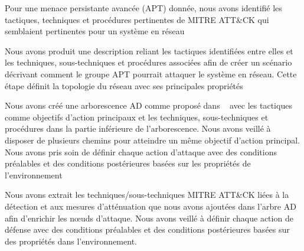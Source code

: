 \begin{enumerate*}[label=\arabic*),itemjoin={;\quad}]

    \item Pour une menace persistante avancée (APT) donnée, nous avons identifié les tactiques, techniques et procédures pertinentes de MITRE ATT\&CK qui semblaient pertinentes pour un système en réseau

    \item Nous avons produit une description reliant les tactiques identifiées entre elles et les techniques, sous-techniques et procédures associées afin de créer un scénario décrivant comment le groupe APT pourrait attaquer le système en réseau. Cette étape définit la topologie du réseau avec ses principales propriétés

    \item Nous avons créé une arborescence AD comme proposé dans ~\cite{BKordy2010} avec les tactiques comme objectifs d'action principaux et les techniques, sous-techniques et procédures dans la partie inférieure de l'arborescence. Nous avons veillé à disposer de plusieurs chemins pour atteindre un même objectif d'action principal. Nous avons pris soin de définir chaque action d'attaque avec des conditions préalables et des conditions postérieures basées sur les propriétés de l'environnement

    \item Nous avons extrait les techniques/sous-techniques MITRE ATT\&CK liées à la détection et aux mesures d'atténuation que nous avons ajoutées dans l'arbre AD afin d'enrichir les nœuds d'attaque. Nous avons veillé à définir chaque action de défense avec des conditions préalables et des conditions postérieures basées sur des propriétés dans l'environnement.


\end{enumerate*}
